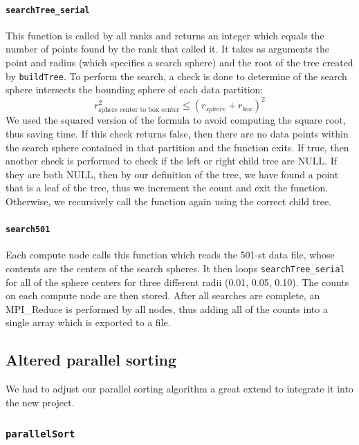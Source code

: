 \documentclass{article}
\begin{document}
\paragraph{\texttt{searchTree\_serial}}
This function is called by all ranks and returns an integer which equals the number of points found by the rank that called it. It takes as arguments the point and radius (which specifies a search sphere) and the root of the tree created by \texttt{buildTree}. To perform the search, a check is done to determine of the search sphere intersects the bounding sphere of each data partition:
\begin{equation}
		r^2_\textrm{sphere center to box center} \le (r_{sphere} + r_{box})^2
\end{equation}
We used the squared version of the formula to avoid computing the square root, thus saving time. If this check returns false, then there are no data points within the search sphere contained in that partition and the function exits. If true, then another check is performed to check if the left or right child tree are NULL. If they are both NULL, then by our definition of the tree, we have found a point that is a leaf of the tree, thus we increment the count and exit the function. Otherwise, we recursively call the function again using the correct child tree.

%
%

\paragraph{\texttt{search501}}
%
%

Each compute node calls this function which reads the 501-st data file, whose contents are the centers of the search spheres. It then loops \texttt{searchTree\_serial} for all of the sphere centers for three different radii (0.01, 0.05, 0.10). The counts on each compute node are then stored. After all searches are complete, an MPI\_Reduce is performed by all nodes, thus adding all of the counts into a single array which is exported to a file.


\subsection{Altered parallel sorting}
We had to adjust our parallel sorting algorithm a great extend to integrate it into the new project.


\subsubsection{\texttt{parallelSort}}
\end{document}

